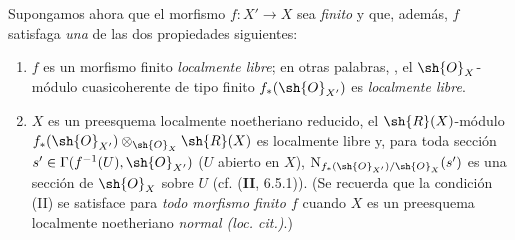 \begin{env}[21.5.3]
\label{IV.21.5.3}
Supongamos ahora que el morfismo $f:X'\to X$ sea \emph{finito} y que, además, $f$ satisfaga \emph{una} de las dos propiedades siguientes:
\begin{enumerate}[label=\Roman*)]
  \item $f$ es un morfismo finito \emph{localmente libre}; en otras palabras, , el $\sh{O}_X$-módulo cuasicoherente de tipo finito $f_*(\sh{O}_{X'})$ es \emph{localmente libre}.
  \item $X$ es un preesquema localmente noetheriano reducido, el $\sh{R}(X)$-módulo $f_*(\sh{O}_{X'})\otimes_{\sh{O}_X}\sh{R}(X)$ es localmente libre y, para toda sección $s'\in\Gamma(f^{-1}(U),\sh{O}_{X'})$ ($U$ abierto
  en $X$), $\mathrm{N}_{f_*(\sh{O}_{X'})/\sh{O}_X}(s')$ es una sección de $\sh{O}_X$ sobre $U$ (cf. (\textbf{II}, 6.5.1)).
  (Se recuerda que la condición (II) se satisface para \emph{todo morfismo finito $f$} cuando $X$ es un preesquema localmente noetheriano \emph{normal (loc. cit.)}.)
\end{enumerate}


\end{env}
